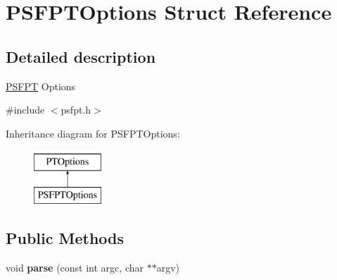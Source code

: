 \hypertarget{struct_p_s_f_p_t_options}{}\section{P\+S\+F\+P\+T\+Options Struct Reference}
\label{struct_p_s_f_p_t_options}


\subsection{Detailed description}
\hyperlink{struct_p_s_f_p_t}{P\+S\+F\+PT} Options 

{\ttfamily \#include $<$psfpt.\+h$>$}

Inheritance diagram for P\+S\+F\+P\+T\+Options\+:\begin{figure}[H]
\begin{center}
\leavevmode
\includegraphics[height=2.000000cm]{struct_p_s_f_p_t_options}
\end{center}
\end{figure}
\subsection*{Public Methods}
\begin{DoxyCompactItemize}
\item 
\mbox{\label{struct_p_s_f_p_t_options_a2a9b0b89e41bbd87b542150811be7bf0}} 
void {\bfseries parse} (const int argc, char $\ast$$\ast$argv)
\end{DoxyCompactItemize}
